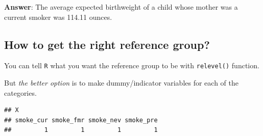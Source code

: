 \documentclass[]{article}
\newenvironment{Shaded}{\begin{snugshade}}{\end{snugshade}}
\newcommand{\DataTypeTok}[1]{\textcolor[rgb]{0.13,0.29,0.53}{#1}}
\newcommand{\DecValTok}[1]{\textcolor[rgb]{0.00,0.00,0.81}{#1}}
\newcommand{\KeywordTok}[1]{\textcolor[rgb]{0.13,0.29,0.53}{\textbf{#1}}}
\newcommand{\NormalTok}[1]{#1}
\newcommand{\OperatorTok}[1]{\textcolor[rgb]{0.81,0.36,0.00}{\textbf{#1}}}
\newcommand{\StringTok}[1]{\textcolor[rgb]{0.31,0.60,0.02}{#1}}
\begin{document}
\textbf{Answer}: The average expected birthweight of a child whose
mother was a current smoker was 114.11 ounces.

\hypertarget{how-to-get-the-right-reference-group}{%
\subsection{How to get the right reference
group?}\label{how-to-get-the-right-reference-group}}

You can tell \texttt{R} what you want the reference group to be with
\texttt{relevel()} function.

\begin{Shaded}
\end{Shaded}

But \emph{the better option} is to make dummy/indicator variables for
each of the categories.

\begin{Shaded}
\end{Shaded}

\begin{verbatim}
## X
## smoke_cur smoke_fmr smoke_nev smoke_pre 
##         1         1         1         1
\end{verbatim}
\end{document}
